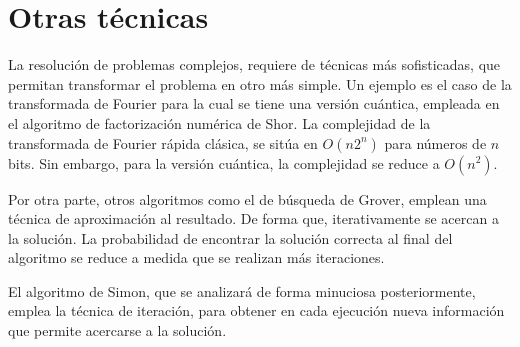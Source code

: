 \section{Otras técnicas}

La resolución de problemas complejos, requiere de técnicas más sofisticadas, que 
permitan transformar el problema en otro más simple. Un ejemplo es el caso de la 
transformada de Fourier para la cual se tiene una versión cuántica, empleada en 
el algoritmo de factorización numérica de Shor. La complejidad de la 
transformada de Fourier rápida clásica, se sitúa en $O(n2^n)$ para números de 
$n$ bits.  Sin embargo, para la versión cuántica, la complejidad se reduce a 
$O(n^2)$.

Por otra parte, otros algoritmos como el de búsqueda de Grover, emplean una 
técnica de aproximación al resultado. De forma que, iterativamente se acercan a 
la solución. La probabilidad de encontrar la solución correcta al final del 
algoritmo se reduce a medida que se realizan más iteraciones.

El algoritmo de Simon, que se analizará de forma minuciosa posteriormente, 
emplea la técnica de iteración, para obtener en cada ejecución nueva información 
que permite acercarse a la solución.



